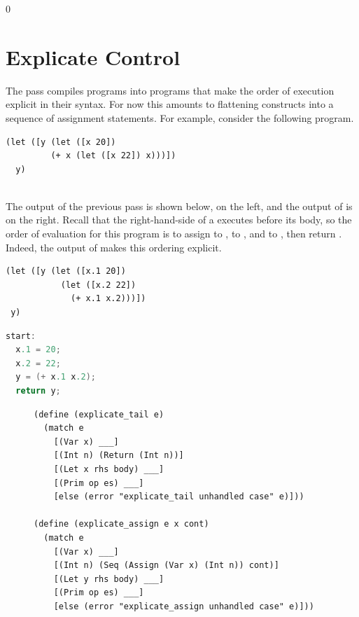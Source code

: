 \documentclass[7x10,nocrop]{TimesAPriori_MIT}%
\def\racketEd{0}
\def\edition{0}
\begin{document}
{\if\edition\racketEd  
\section{Explicate Control}
\label{sec:explicate-control-Lvar}

The  pass compiles \LangVar{} programs into \LangCVar{}
programs that make the order of execution explicit in their
syntax. For now this amounts to flattening  constructs into a
sequence of assignment statements. For example, consider the following
\LangVar{} program.\\
\begin{minipage}{0.96\textwidth}
\begin{lstlisting}
(let ([y (let ([x 20])
         (+ x (let ([x 22]) x)))])
  y)
\end{lstlisting}
\end{minipage}\\
%
The output of the previous pass is shown below, on the left, and the
output of  is on the right. Recall that the
right-hand-side of a  executes before its body, so the order
of evaluation for this program is to assign  to ,
 to , and  to , then
return . Indeed, the output of  makes
this ordering explicit.
\begin{transformation}
\begin{lstlisting}
(let ([y (let ([x.1 20]) 
           (let ([x.2 22])
             (+ x.1 x.2)))])
 y)
\end{lstlisting}
\compilesto
\begin{lstlisting}[language=C]
start:
  x.1 = 20;
  x.2 = 22;
  y = (+ x.1 x.2);
  return y;
\end{lstlisting}
\end{transformation}

\begin{figure}[tbp]
\begin{lstlisting}
(define (explicate_tail e)
  (match e
    [(Var x) ___]
    [(Int n) (Return (Int n))]
    [(Let x rhs body) ___]
    [(Prim op es) ___]
    [else (error "explicate_tail unhandled case" e)]))

(define (explicate_assign e x cont)
  (match e
    [(Var x) ___]
    [(Int n) (Seq (Assign (Var x) (Int n)) cont)]
    [(Let y rhs body) ___]
    [(Prim op es) ___]
    [else (error "explicate_assign unhandled case" e)]))


\end{lstlisting}
\end{figure}}
\end{document}
